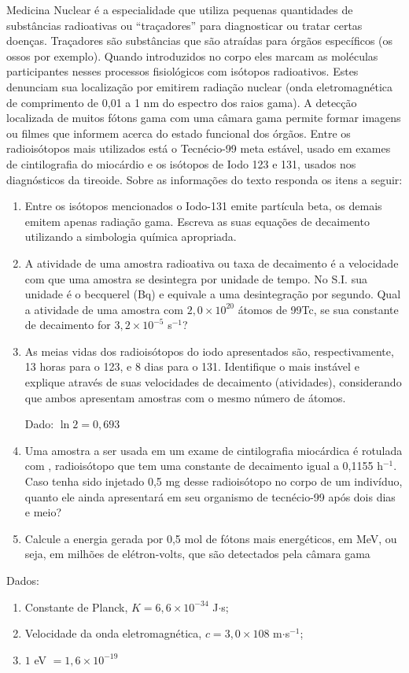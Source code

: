 Medicina Nuclear é a especialidade que utiliza pequenas quantidades de substâncias radioativas ou “traçadores” para diagnosticar ou tratar certas doenças.
Traçadores são substâncias que são atraídas para órgãos específicos (os ossos por exemplo).
Quando introduzidos no corpo eles marcam as moléculas participantes nesses processos fisiológicos com isótopos radioativos.
Estes denunciam sua localização por emitirem radiação nuclear (onda eletromagnética de comprimento de 0,01 a 1 nm do espectro dos raios gama).
A detecção localizada de muitos fótons gama com uma câmara gama permite formar imagens ou filmes que informem acerca do estado funcional dos órgãos.
Entre os radioisótopos mais utilizados está o Tecnécio-99 meta estável, usado em exames de cintilografia do miocárdio e os isótopos de Iodo 123 e 131, usados nos diagnósticos da tireoide.
Sobre as informações do texto responda os itens a seguir: 

\begin{enumerate}[label = (\alph*)]
	\item Entre os isótopos mencionados o Iodo-131 emite partícula beta, os demais emitem apenas radiação gama. Escreva as suas equações de decaimento utilizando a simbologia química apropriada. 
	\item A atividade de uma amostra radioativa ou taxa de decaimento é a velocidade com que uma amostra se desintegra por unidade de tempo. No S.I. sua unidade é o becquerel (Bq) e equivale a uma desintegração por segundo. Qual a atividade de uma amostra com $2,0 \times 10^{20}$ átomos de 99Tc, se sua constante de decaimento for $3,2 \times 10^{-5}$ s$^{-1}$? 
	\item  As meias vidas dos radioisótopos do iodo apresentados são, respectivamente, 13 horas para o 123, e 8 dias para o 131.
		Identifique o mais instável e explique através de suas velocidades de decaimento (atividades), considerando que ambos apresentam amostras com o mesmo número de átomos.
		
		Dado: $\ln 2 =  0,693$ 
	\item Uma amostra a ser usada em um exame de cintilografia miocárdica é rotulada com , radioisótopo que tem uma constante de decaimento igual a 0,1155 h$^{-1}$. Caso tenha sido injetado 0,5 mg desse radioisótopo no corpo de um indivíduo, quanto ele ainda apresentará em seu organismo de tecnécio-99 após dois dias e meio? 
	\item Calcule a energia gerada por 0,5 mol de fótons mais energéticos, em MeV, ou seja, em milhões de elétron-volts, que são detectados pela câmara gama 
\end{enumerate}

Dados:
\begin{enumerate}[label = --]
	\item Constante de Planck,  $K = 6,6 \times 10^{-34}$ J$\cdot$s;
	\item Velocidade da onda eletromagnética,  $c = 3,0 \times 108$ m$\cdot$s$^{-1}$;
	\item $1$ eV $= 1,6 \times 10^{-19}$
\end{enumerate}
 
